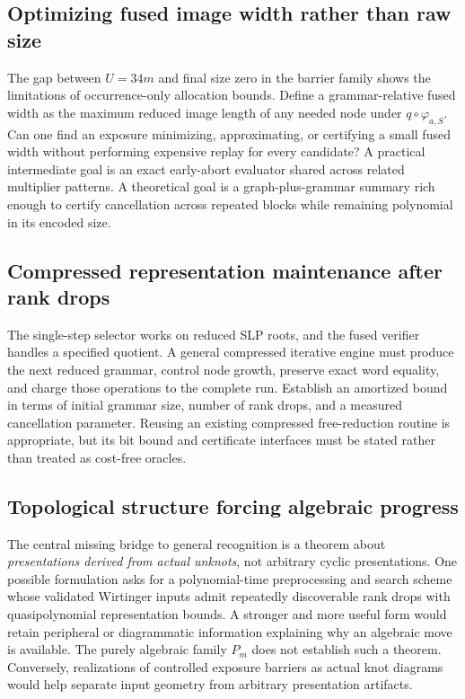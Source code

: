 \documentclass[11pt,letterpaper]{article}
\theoremstyle{definition}\newtheorem{definition}[theorem]{Definition}
\newcommand{\wh}{\varphi_{a,S}}
\begin{document}
\subsection{Optimizing fused image width rather than raw size}
The gap between $U=34m$ and final size zero in the barrier family shows the limitations of occurrence-only allocation bounds. Define a grammar-relative fused width as the maximum reduced image length of any needed node under $q\circ\wh$. Can one find an exposure minimizing, approximating, or certifying a small fused width without performing expensive replay for every candidate? A practical intermediate goal is an exact early-abort evaluator shared across related multiplier patterns. A theoretical goal is a graph-plus-grammar summary rich enough to certify cancellation across repeated blocks while remaining polynomial in its encoded size.

\subsection{Compressed representation maintenance after rank drops}
The single-step selector works on reduced SLP roots, and the fused verifier handles a specified quotient. A general compressed iterative engine must produce the next reduced grammar, control node growth, preserve exact word equality, and charge those operations to the complete run. Establish an amortized bound in terms of initial grammar size, number of rank drops, and a measured cancellation parameter. Reusing an existing compressed free-reduction routine is appropriate, but its bit bound and certificate interfaces must be stated rather than treated as cost-free oracles.

\subsection{Topological structure forcing algebraic progress}
The central missing bridge to general recognition is a theorem about \emph{presentations derived from actual unknots}, not arbitrary cyclic presentations. One possible formulation asks for a polynomial-time preprocessing and search scheme whose validated Wirtinger inputs admit repeatedly discoverable rank drops with quasipolynomial representation bounds. A stronger and more useful form would retain peripheral or diagrammatic information explaining why an algebraic move is available. The purely algebraic family $P_m$ does not establish such a theorem. Conversely, realizations of controlled exposure barriers as actual knot diagrams would help separate input geometry from arbitrary presentation artifacts.
\end{document}
